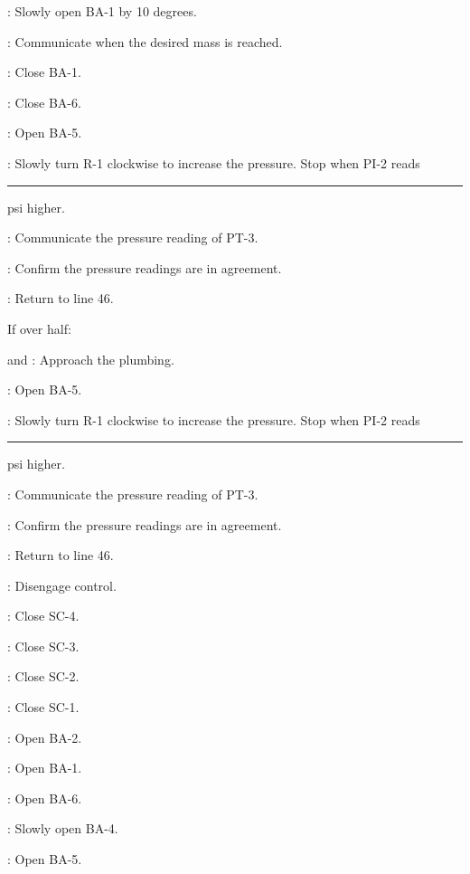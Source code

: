 \begin{checklist}
\begin{checklist}
            \item \primary{}: Slowly open BA-1 by 10 degrees.
            \item \daq{}: Communicate when the desired mass is reached. 
            \item \primary{}: Close BA-1.
            \item \primary{}: Close BA-6.
            \item \primary{}: Open BA-5.
            \item \primary{}: Slowly turn R-1 clockwise to increase the pressure. Stop when PI-2 reads \rule{5em}{0.4pt} psi higher.
            \item \daq{}: Communicate the pressure reading of PT-3. 
            \item \ops{}: Confirm the pressure readings are in agreement. 
            \item \ops{}: Return to line 46.
    \end{checklist}
   \item If over half:
    \begin{checklist}
            \item \primary{} and \secondary{}: Approach the plumbing.
            \item \primary{}: Open BA-5. 
            \item \primary{}: Slowly turn R-1 clockwise to increase the pressure. Stop when PI-2 reads \rule{5em}{0.4pt} psi higher.
            \item \daq{}: Communicate the pressure reading of PT-3. 
            \item \ops{}: Confirm the pressure readings are in agreement. 
            \item \ops{}: Return to line 46. 
    \end{checklist}
    \item \control{}: Disengage control. 
    \item \primary{}: Close SC-4.
    \item \primary{}: Close SC-3.
    \item \primary{}: Close SC-2.
    \item \primary{}: Close SC-1.
    \item \primary{}: Open BA-2.
    \item \primary{}: Open BA-1. 
    \item \primary{}: Open BA-6.
    \item \primary{}: Slowly open BA-4.
    \item \primary{}: Open BA-5. 

\end{checklist}
